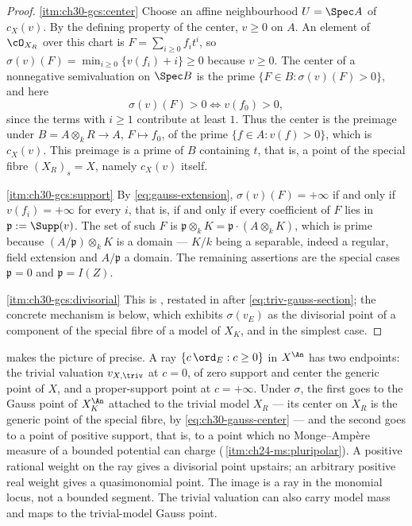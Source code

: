 \begin{proof}
\cref{itm:ch30-gcs:center}  Choose an affine neighbourhood
$U=\Spec A$ of $c_X(v)$.  By the defining property of the center,
$v\geq0$ on $A$.  An element of $\cO_{X_R}$ over this chart is
$F=\sum_{i\geq0}f_it^i$, so
$\sigma(v)(F)=\min_{i\geq0}\{v(f_i)+i\}\geq0$ because $v\geq0$.  The
center of a nonnegative semivaluation on $\Spec B$ is the prime
$\{F\in B:\sigma(v)(F)>0\}$, and here
\[
 \sigma(v)(F)>0
 \iff v(f_0)>0,
\]
since the terms with $i\geq1$ contribute at least $1$.  Thus the center
is the preimage under $B=A\otimes_kR\to A$, $F\mapsto f_0$, of the prime
$\{f\in A:v(f)>0\}$, which is $c_X(v)$.  This preimage is a prime of
$B$ containing $t$, that is, a point of the special fibre
$(X_R)_s=X$, namely $c_X(v)$ itself.

\cref{itm:ch30-gcs:support}  By \eqref{eq:gauss-extension},
$\sigma(v)(F)=+\infty$ if and only if $v(f_i)=+\infty$ for every $i$,
that is, if and only if every coefficient of $F$ lies in
$\mathfrak p:=\Supp(v)$.  The set of such $F$ is
$\mathfrak p\otimes_kK=\mathfrak p\cdot(A\otimes_kK)$, which is prime
because $(A/\mathfrak p)\otimes_kK$ is a domain --- $K/k$ being a
separable, indeed a regular, field extension and $A/\mathfrak p$ a
domain.  The remaining assertions are the special cases
$\mathfrak p=0$ and $\mathfrak p=I(Z)$.

\cref{itm:ch30-gcs:divisorial}  This is
\cite[\S1]{BJ22}, restated in  after
\eqref{eq:triv-gauss-section}; the concrete mechanism is
 below, which exhibits $\sigma(v_E)$
as the divisorial point of a component of the special fibre of a model of
$X_K$, and  in the simplest case.
\end{proof}

\begin{remark}
\label{rem:ch30-gauss-ray-endpoints}
 makes the picture of
 precise.  A ray $\{c\,\ord_E:c\geq0\}$ in
$X^{\An}$ has two endpoints: the trivial valuation $v_{X,\triv}$ at
$c=0$, of zero support and center the generic point of $X$, and a
proper-support point at $c=+\infty$.  Under $\sigma$, the first goes to
the Gauss point of $X_K^{\An}$ attached to the trivial model $X_R$ ---
its center on $X_R$ is the generic point of the special fibre, by
\eqref{eq:ch30-gauss-center} --- and the second goes to a point of positive
support, that is, to a point which no Monge--Amp\`ere measure of a bounded
potential can charge
(\,\cref{itm:ch24-ms:pluripolar}).  A positive rational weight on the ray gives a divisorial point upstairs;
an arbitrary positive real weight gives a quasimonomial point.
The image is a ray in the monomial locus, not a bounded segment.
The trivial valuation can also carry model mass and maps to the
trivial-model Gauss point.
\end{remark}

